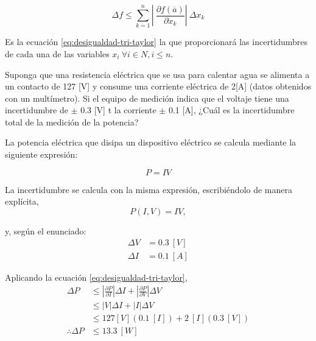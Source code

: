 \begin{equation} \label{eq:desigualdad-tri-taylor}
    \Delta f \leq \sum_{k=1}^{n} \left |\ 
    \frac{\partial f(\overline{a})}{\partial x_k} \right| \
    \Delta x_k
\end{equation}

Es la ecuación \ref{eq:desigualdad-tri-taylor} la que proporcionará las
incertidumbres de cada una de las variables $x_i\ \forall i \in N, i \leq n$.

\begin{ex}

    Suponga que una resistencia eléctrica que se usa para calentar agua se
    alimenta a un contacto de 127 [V] y consume una corriente eléctrica de
    2[A] (datos obtenidos con un multímetro). Si el equipo de medición
    indica que el voltaje tiene una incertidumbre de $\pm$ 0.3 [V] t la
    corriente $\pm$ 0.1 [A], ¿Cuál es la incertidumbre total de la medición de
    la potencia?

    \begin{solution}
        La potencia eléctrica que disipa un dispositivo eléctrico se
        calcula mediante la siguiente expresión:

        \begin{equation*}
            P = IV
        \end{equation*}

        La incertidumbre se calcula con la misma expresión,
        escribiéndolo de manera explícita,
        \[
            P(I, V) = IV,
        \]

        \noindent y, según el enunciado:
        \begin{align*}
            \Delta V &= 0.3\ [\si{V}] \\
            \Delta I &= 0.1\ [\si{A}]
        \end{align*}

        Aplicando la ecuación \ref{eq:desigualdad-tri-taylor},
        \begin{align*}
            \Delta P &\leq
            \left| \frac{\partial P}{\partial I} \right| \Delta I +
            \left| \frac{\partial P}{\partial V} \right| \Delta V \\
                     &\leq \left| V \right| \Delta I + \left| I\right|
                     \Delta V \\
                     &\leq 127 [\si{V}](0.1\ [\si{I}]) + 2\ [\si{I}](0.3\ [\si{V}]) \\
            \therefore \Delta P &\leq 13.3\ [\si{W}]
        \end{align*}
    \end{solution}
\end{ex}


